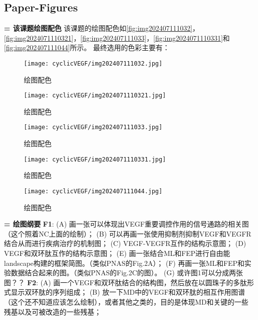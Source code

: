 \subsection{Paper-Figures}
\noindent \textbf{= 该课题绘图配色}
\newline 该课题的绘图配色如\autoref{fig:img202407111032}，\autoref{fig:img2024071110321}，\autoref{fig:img202407111033}，\autoref{fig:img2024071110331}和\autoref{fig:img202407111044}所示。
\newline 最终选用的色彩主要有：
\begin{figure}[htbp]
    \centering
    \texttt{[image: cyclicVEGF/img202407111032.jpg]}
    \caption{\label{fig:img202407111032}绘图配色}
\end{figure}
\begin{figure}[htbp]
    \centering
    \texttt{[image: cyclicVEGF/img2024071110321.jpg]}
    \caption{\label{fig:img2024071110321}绘图配色}
\end{figure}
\begin{figure}[htbp]
    \centering
    \texttt{[image: cyclicVEGF/img202407111033.jpg]}
    \caption{\label{fig:img202407111033}绘图配色}
\end{figure}
\begin{figure}[htbp]
    \centering
    \texttt{[image: cyclicVEGF/img2024071110331.jpg]}
    \caption{\label{fig:img2024071110331}绘图配色}
\end{figure}
\begin{figure}[htbp]
    \centering
    \texttt{[image: cyclicVEGF/img202407111044.jpg]}
    \caption{\label{fig:img202407111044}绘图配色}
\end{figure}
\newline \noindent\textbf{= 绘图纲要}
\newline\noindent\textbf{F1}: (A) 画一张可以体现出VEGF重要调控作用的信号通路的相关图（这个照着NC上面的绘制）；
(B) 可以再画一张使用抑制剂抑制VEGF和VEGFR结合从而进行疾病治疗的机制图；
(C) VEGF-VEGFR互作的结构示意图；
(D) VEGF和双环肽互作的结构示意图；
(E) 画一张结合ML和FEP进行自由能landscape构建的框架简图。（类似PNAS的Fig.2A）；
(F) 再画一张ML和FEP和实验数据结合起来的图。（类似PNAS的Fig.2C的图）。
(G) 或许图1可以分成两张图？？
\newline\textbf{F2}: (A) 画一个VEGF和双环肽结合的结构图，然后放在以圆珠子的多肽形式显示双环肽的序列组成；
(B) 放一下MD中的VEGF和双环肽的相互作用图谱（这个还不知道应该怎么绘制），或者其他之类的，目的是体现MD和关键的一些残基以及可被改造的一些残基；
